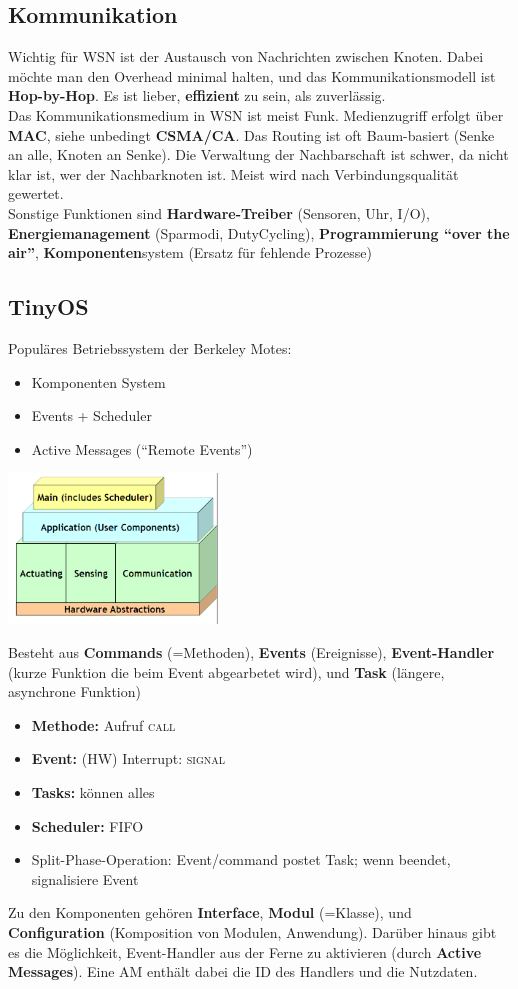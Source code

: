\documentclass[a4paper]{article}
\begin{document}
 \subsection{Kommunikation}
 Wichtig für WSN ist der Austausch von Nachrichten zwischen Knoten. Dabei möchte man den Overhead minimal halten, und das Kommunikationsmodell ist \textbf{Hop-by-Hop}. Es ist lieber, \textbf{effizient} zu sein, als zuverlässig.\\
 
 Das Kommunikationsmedium in WSN ist meist Funk. Medienzugriff erfolgt über \textbf{MAC}, siehe unbedingt \textbf{CSMA/CA}. Das Routing ist oft Baum-basiert (Senke an alle, Knoten an Senke). Die Verwaltung der Nachbarschaft ist schwer, da nicht klar ist, wer der Nachbarknoten ist. Meist wird nach Verbindungsqualität gewertet.\\
 
 Sonstige Funktionen sind \textbf{Hardware-Treiber} (Sensoren, Uhr, I/O), \textbf{Energiemanagement} (Sparmodi, DutyCycling), \textbf{Programmierung ``over the air''}, \textbf{Komponenten}system (Ersatz für fehlende Prozesse)
 
\subsection{TinyOS}
Populäres Betriebssystem der Berkeley Motes:
\begin{itemize}
	\item Komponenten System
	\item Events + Scheduler
	\item Active Messages (``Remote Events'')
\end{itemize}
\begin{center}
\includegraphics[height = 4cm]{TinyOS.png}
\end{center}
Besteht aus \textbf{Commands} (=Methoden), \textbf{Events} (Ereignisse), \textbf{Event-Handler} (kurze Funktion die beim Event abgearbetet wird), und \textbf{Task} (längere, asynchrone Funktion)
\begin{itemize}
	\item \textbf{Methode:} Aufruf \textsc{call}
	\item \textbf{Event:} (HW) Interrupt: \textsc{signal}
	\item \textbf{Tasks:} können alles
	\item \textbf{Scheduler:} FIFO
	\item Split-Phase-Operation: Event/command postet Task; wenn beendet, signalisiere Event
\end{itemize}
Zu den Komponenten gehören \textbf{Interface}, \textbf{Modul} (=Klasse), und \textbf{Configuration} (Komposition von Modulen, Anwendung). Darüber hinaus gibt es die Möglichkeit, Event-Handler aus der Ferne zu aktivieren (durch \textbf{Active Messages}). Eine AM enthält dabei die ID des Handlers und die Nutzdaten.
\end{document}
